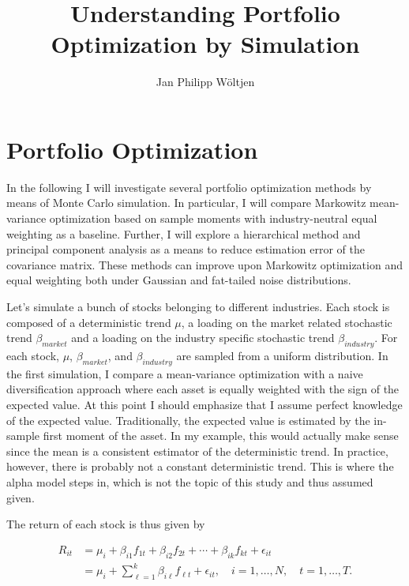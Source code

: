 \documentclass[11pt]{article}
\title{Understanding Portfolio Optimization by Simulation}
\author{Jan Philipp Wöltjen}
\begin{document}
    
    
    \maketitle
    
    

    
    \hypertarget{portfolio-optimization}{%
\section{Portfolio Optimization}\label{portfolio-optimization}}

    In the following I will investigate several portfolio optimization
methods by means of Monte Carlo simulation. In particular, I will
compare Markowitz mean-variance optimization based on sample moments
with industry-neutral equal weighting as a baseline. Further, I will
explore a hierarchical method and principal component analysis as a
means to reduce estimation error of the covariance matrix. These methods
can improve upon Markowitz optimization and equal weighting both under
Gaussian and fat-tailed noise distributions.

Let's simulate a bunch of stocks belonging to different industries. Each
stock is composed of a deterministic trend \(\mu\), a loading on the
market related stochastic trend \(\beta_{market}\) and a loading on the
industry specific stochastic trend \(\beta_{industry}\). For each stock,
\(\mu\), \(\beta_{market}\), and \(\beta_{industry}\) are sampled from a
uniform distribution. In the first simulation, I compare a mean-variance
optimization with a naive diversification approach where each asset is
equally weighted with the sign of the expected value. At this point I
should emphasize that I assume perfect knowledge of the expected value.
Traditionally, the expected value is estimated by the in-sample first
moment of the asset. In my example, this would actually make sense since
the mean is a consistent estimator of the deterministic trend. In
practice, however, there is probably not a constant deterministic trend.
This is where the alpha model steps in, which is not the topic of this
study and thus assumed given.

The return of each stock is thus given by

\[\begin{aligned} R_{i t} &=\mu_{i}+\beta_{i 1} f_{1 t}+\beta_{i 2} f_{2 t}+\cdots+\beta_{i k} f_{k t}+\epsilon_{i t} \\ &=\mu_{i}+\sum_{\ell=1}^{k} \beta_{i \ell} f_{\ell t}+\epsilon_{i t}, \quad i=1, \ldots, N, \quad t=1, \ldots, T. \end{aligned}\]
\end{document}
